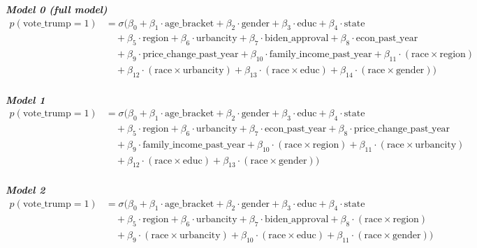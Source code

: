 \documentclass[letter]{article}
\begin{document}
\textbf{\textit{Model 0 (full model)}}
\begin{align*}
p(\text{vote\_trump} = 1) &= \sigma\Big(
  \beta_0
  + \beta_1 \cdot \text{age\_bracket}
  + \beta_2 \cdot \text{gender}
  + \beta_3 \cdot \text{educ}
  + \beta_4 \cdot \text{state} \\
  &\quad + \beta_5 \cdot \text{region}
  + \beta_6 \cdot \text{urbancity}
  + \beta_7 \cdot \text{biden\_approval}
  + \beta_8 \cdot \text{econ\_past\_year} \\
  &\quad + \beta_9 \cdot \text{price\_change\_past\_year}
  + \beta_{10} \cdot \text{family\_income\_past\_year}
  + \beta_{11} \cdot (\text{race} \times \text{region}) \\
  &\quad + \beta_{12} \cdot (\text{race} \times \text{urbancity})
  + \beta_{13} \cdot (\text{race} \times \text{educ})
  + \beta_{14} \cdot (\text{race} \times \text{gender})
\Big)
\end{align*}
\\
\textit{\textbf{Model 1}}
\begin{align*}
p(\text{vote\_trump} = 1) &= \sigma\Big(
  \beta_0
  + \beta_1 \cdot \text{age\_bracket}
  + \beta_2 \cdot \text{gender}
  + \beta_3 \cdot \text{educ}
  + \beta_4 \cdot \text{state} \\
  &\quad + \beta_5 \cdot \text{region}
  + \beta_6 \cdot \text{urbancity}
  + \beta_7 \cdot \text{econ\_past\_year}
  + \beta_8 \cdot \text{price\_change\_past\_year} \\
  &\quad + \beta_9 \cdot \text{family\_income\_past\_year}
  + \beta_{10} \cdot (\text{race} \times \text{region})
  + \beta_{11} \cdot (\text{race} \times \text{urbancity}) \\
  &\quad + \beta_{12} \cdot (\text{race} \times \text{educ})
  + \beta_{13} \cdot (\text{race} \times \text{gender})
\Big)
\end{align*}
\\
\textit{\textbf{Model 2}}
\begin{align*}
p(\text{vote\_trump} = 1) &= \sigma\Big(
  \beta_0
  + \beta_1 \cdot \text{age\_bracket}
  + \beta_2 \cdot \text{gender}
  + \beta_3 \cdot \text{educ}
  + \beta_4 \cdot \text{state} \\
  &\quad + \beta_5 \cdot \text{region}
  + \beta_6 \cdot \text{urbancity}
  + \beta_7 \cdot \text{biden\_approval}
  + \beta_8 \cdot (\text{race} \times \text{region}) \\
  &\quad + \beta_9 \cdot (\text{race} \times \text{urbancity})
  + \beta_{10} \cdot (\text{race} \times \text{educ})
  + \beta_{11} \cdot (\text{race} \times \text{gender})
\Big)
\end{align*}
\end{document}
